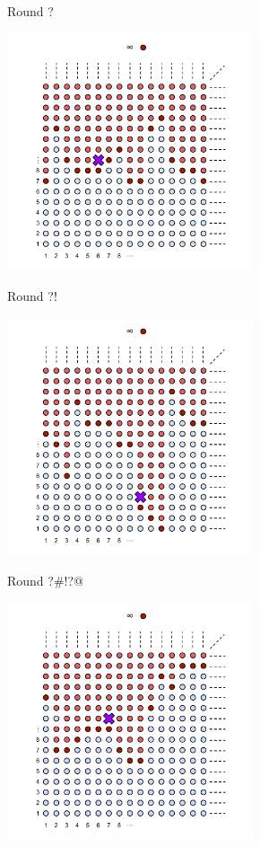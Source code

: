 \documentclass{beamer}
\begin{document}
\begin{frame}
Round ?
\begin{center}
    \includegraphics[height=7cm]{images/topdarts_fan_p1_tactic}
  \end{center}
\end{frame}
\begin{frame}
Round ?!
\begin{center}
    \includegraphics[height=7cm]{images/topdarts_fan_p2_tactic}
  \end{center}
\end{frame}
\begin{frame}
Round ?\#!?@
\begin{center}
    \includegraphics[height=7cm]{images/topdarts_fan_p3_tactic}
  \end{center}
\end{frame}
\end{document}
